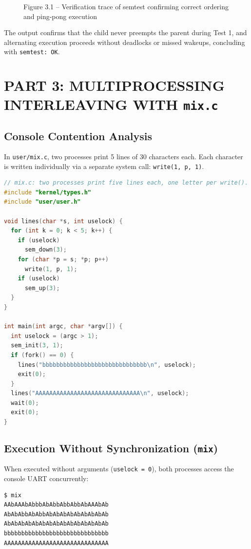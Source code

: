 \documentclass[12pt,a4paper]{report}
\numberwithin{equation}{chapter}
\numberwithin{figure}{chapter}
\numberwithin{table}{chapter}
\begin{document}
\begin{figure}[H]
\centering
\caption{Figure 3.1 -- Verification trace of semtest confirming correct ordering and ping-pong execution}
\end{figure}

The output confirms that the child never preempts the parent during Test 1, and alternating execution proceeds without deadlocks or missed wakeups, concluding with \texttt{semtest: OK}.

\chapter{PART 3: MULTIPROCESSING INTERLEAVING WITH \texttt{mix.c}}

\section{Console Contention Analysis}
In \texttt{user/mix.c}, two processes print 5 lines of 30 characters each. Each character is written individually via a separate system call: \texttt{write(1, p, 1)}.

\begin{lstlisting}[language=C]
// mix.c: two processes print five lines each, one letter per write().
#include "kernel/types.h"
#include "user/user.h"

void lines(char *s, int uselock) {
  for (int k = 0; k < 5; k++) {
    if (uselock)
      sem_down(3);
    for (char *p = s; *p; p++)
      write(1, p, 1);
    if (uselock)
      sem_up(3);
  }
}

int main(int argc, char *argv[]) {
  int uselock = (argc > 1);
  sem_init(3, 1);
  if (fork() == 0) {
    lines("bbbbbbbbbbbbbbbbbbbbbbbbbbbbbb\n", uselock);
    exit(0);
  }
  lines("AAAAAAAAAAAAAAAAAAAAAAAAAAAAAA\n", uselock);
  wait(0);
  exit(0);
}
\end{lstlisting}

\section{Execution Without Synchronization (\texttt{mix})}
When executed without arguments (\texttt{uselock = 0}), both processes access the console UART concurrently:

\begin{lstlisting}[language=bash]
$ mix
AAbAAAbAbbbAbAbbAbbAbbAbAAAbAb
AbAbAbbAbAbbAbAbAbAbAbAbAbAbAb
AbAbAbAbAbAbAbAbAbAbAbAbAbAbAb
bbbbbbbbbbbbbbbbbbbbbbbbbbbbbb
AAAAAAAAAAAAAAAAAAAAAAAAAAAAAA
\end{lstlisting}
\end{document}
